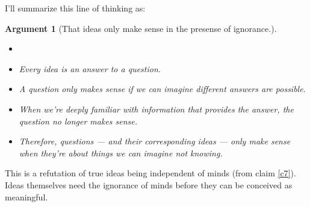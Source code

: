 \documentclass[11pt, oneside]{article}   	%
\newtheorem{argt}{Argument}
\begin{document}
I'll summarize this line of thinking as:
\begin{argt}[That ideas only make sense in the presense of ignorance.]
    \label{a3}
    \normalfont
    \begin{itemize}
        \item[]
        \item Every idea is an answer to a question.
        \item A question only makes sense if we can imagine different
            answers are possible.
        \item When we're deeply familiar with information that
            provides the answer, the question no longer makes sense.
        \item Therefore, questions --- and their corresponding ideas --- only
            make sense when they're about things we can imagine not knowing.
    \end{itemize}
\end{argt}
This is a refutation of true ideas being independent of minds (from
claim \ref{c7}). Ideas themselves need the ignorance of minds before they can be
conceived as meaningful.

\end{document}
